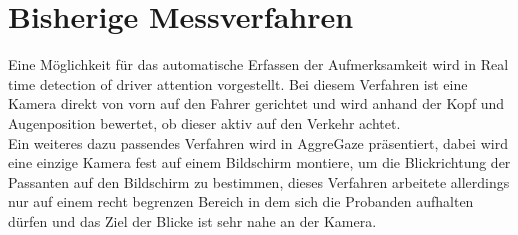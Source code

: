 \section{Bisherige Messverfahren}
Eine Möglichkeit für das automatische Erfassen der Aufmerksamkeit wird in \glqq Real time detection of driver attention\grqq\cite{driverAttention} vorgestellt. Bei diesem Verfahren ist eine Kamera direkt von vorn auf den Fahrer gerichtet und wird anhand der Kopf und Augenposition bewertet, ob dieser aktiv auf den Verkehr achtet.\\
Ein weiteres dazu passendes Verfahren wird in \glqq AggreGaze\grqq \cite{AggreGaze} präsentiert, dabei wird eine einzige Kamera fest auf einem Bildschirm montiere, um die Blickrichtung der Passanten auf den Bildschirm zu bestimmen, dieses Verfahren arbeitete allerdings nur auf einem recht begrenzen Bereich in dem sich die Probanden aufhalten dürfen und das Ziel der Blicke ist sehr nahe an der Kamera.